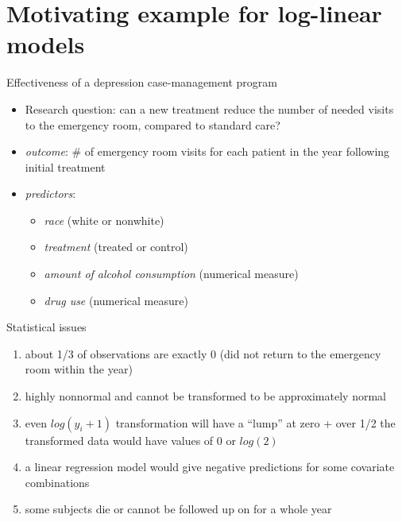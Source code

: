 \documentclass[
  ignorenonframetext,
]{beamer}
\providecommand{\tightlist}{%
  \setlength{\itemsep}{0pt}\setlength{\parskip}{0pt}}
\begin{document}
\hypertarget{motivating-example-for-log-linear-models}{%
\section{Motivating example for log-linear
models}\label{motivating-example-for-log-linear-models}}

\begin{frame}{Effectiveness of a depression case-management program}
\protect\hypertarget{effectiveness-of-a-depression-case-management-program}{}

\begin{itemize}
\tightlist
\item
  Research question: can a new treatment reduce the number of needed
  visits to the emergency room, compared to standard care?
\item
  \emph{outcome}: \# of emergency room visits for each patient in the
  year following initial treatment
\item
  \emph{predictors}:

  \begin{itemize}
  \tightlist
  \item
    \emph{race} (white or nonwhite)
  \item
    \emph{treatment} (treated or control)
  \item
    \emph{amount of alcohol consumption} (numerical measure)
  \item
    \emph{drug use} (numerical measure)
  \end{itemize}
\end{itemize}

\end{frame}

\begin{frame}{Statistical issues}
\protect\hypertarget{statistical-issues}{}

\begin{enumerate}
\tightlist
\item
  about 1/3 of observations are exactly 0 (did not return to the
  emergency room within the year)
\item
  highly nonnormal and cannot be transformed to be approximately normal
\item
  even \(log(y_i + 1)\) transformation will have a ``lump'' at zero +
  over 1/2 the transformed data would have values of 0 or \(log(2)\)
\item
  a linear regression model would give negative predictions for some
  covariate combinations
\item
  some subjects die or cannot be followed up on for a whole year
\end{enumerate}

\end{frame}
\end{document}
